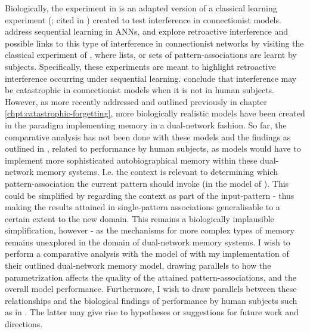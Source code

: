 Biologically, the experiment in \citep{Hattori2014, Hattori2010} is an adapted version of a classical learning experiment (\cite{Barnes1959}; cited in \cite{McCloskey1989}) created to test interference in connectionist models. \cite{McCloskey1989} address sequential learning in ANNs, and explore retroactive interference and possible links to this type of interference in connectionist networks by visiting the classical experiment of \citep{Barnes1959}, where lists, or sets of pattern-associations are learnt by subjects. Specifically, these experiments are meant to highlight retroactive interference occurring under sequential learning. \cite{McCloskey1989} conclude that interference may be catastrophic in connectionist models when it is not in human subjects. However, as more recently addressed and outlined previously in chapter \ref{chpt:catastrophic-forgetting}, more biologically realistic models have been created in the paradigm implementing memory in a dual-network fashion. So far, the comparative analysis has not been done with these models and the findings as outlined in \citep{McCloskey1989}, related to performance by human subjects, as models would have to implement more sophisticated autobiographical memory within these dual-network memory systems. I.e. the context is relevant to determining which pattern-association the current pattern should invoke (in the model of \cite{Hattori2014}). This could be simplified by regarding the context as part of the input-pattern - thus making the results attained in single-pattern associations generalisable to a certain extent to the new domain. This remains a biologically implausible simplification, however - as the mechanisms for more complex types of memory remains unexplored in the domain of dual-network memory systems. I wish to perform a comparative analysis with the model of \cite{Hattori2014} with my implementation of their outlined dual-network memory model, drawing parallels to how the parametrization affects the quality of the attained pattern-associations, and the overall model performance. Furthermore, I wish to draw parallels between these relationships and the biological findings of performance by human subjects such as in \citep{McCloskey1989, Barnes1959}. The latter may give rise to hypotheses or suggestions for future work and directions.



